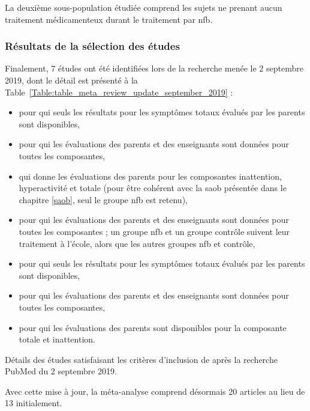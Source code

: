 La deuxième sous-population étudiée comprend les sujets ne prenant aucun traitement médicamenteux durant le traitement par \gls{nfb}.

\subsubsection{Résultats de la sélection des études}

Finalement, 7 études ont été identifiées lors de la recherche menée le 2 septembre 2019, dont le détail est présenté 
à la Table~\ref{Table:table_meta_review_update_september_2019} : 
\begin{itemize}
\item \citep{Baumeister2016} pour qui seuls les résultats pour les symptômes totaux évalués par les parents sont disponibles,
\item \citep{Strehl2017} pour qui les évaluations des parents et des enseignants sont données pour toutes les composantes,
\item \citep{Bazanova2018} qui donne les évaluations des parents pour les composantes inattention, hyperactivité et totale (pour être cohérent avec 
la \gls{saob} présentée dans le chapitre \ref{saob}, seul le groupe \gls{nfb} est retenu),
\item \citep{Minder2018} pour qui les évaluations des parents et des enseignants sont données pour toutes les composantes ; un groupe \gls{nfb}
et un groupe contrôle suivent leur traitement à l'école, alors que les autres groupes \gls{nfb} et contrôle,
\item \citep{Moreno2019} pour qui seuls les résultats pour les symptômes totaux évalués par les parents sont disponibles,
\item \citep{Shereena2019} pour qui les évaluations des parents et des enseignants sont données pour toutes les composantes,
\item \citep{Aggensteiner2019} pour qui les évaluations des parents sont disponibles pour la composante totale et inattention. 
\end{itemize}

\begin{table}[h!]
  \centering
  \caption{Détails des études satisfaisant les critères d'inclusion de \citep{Cortese2016} après la recherche PubMed du 2 septembre 2019.}
  
  \label{Table:table_meta_review_update_september_2019}
\end{table} 

Avec cette mise à jour, la méta-analyse comprend désormais 20 articles au lieu de 13 initialement.

